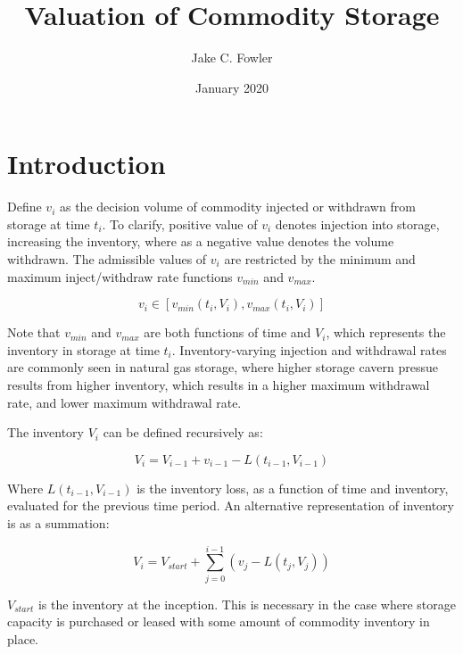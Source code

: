 \documentclass{article}
\title{Valuation of Commodity Storage}
\author{Jake C. Fowler}
\date{January 2020}
\begin{document}
\newcommand{\+}[1]{\ensuremath{\mathbf{#1}}}

\maketitle

\section{Introduction}

Define $v_i$ as the decision volume of commodity injected or withdrawn from storage at time
$t_i$. To clarify, positive value of $v_i$ denotes injection into storage, increasing the
inventory, where as a negative value denotes the volume withdrawn. The admissible values
of $v_i$ are restricted by the minimum and maximum inject/withdraw rate functions
$v_{min}$ and $v_{max}$.

\begin{equation}
    v_i \in [v_{min}(t_i, V_i), v_{max}(t_i, V_i)]
\end{equation}

Note that $v_{min}$ and $v_{max}$ are both functions of time and $V_i$, which represents the
inventory in storage at time $t_i$. Inventory-varying injection and withdrawal rates are commonly
seen in natural gas storage, where higher storage cavern pressue results from higher inventory,
which results in a higher maximum withdrawal rate, and lower maximum withdrawal rate.

\bigskip

The inventory $V_i$ can be defined recursively as:

\begin{equation}
    V_i = V_{i-1} + v_{i-1} - L(t_{i-1}, V_{i-1}) 
\end{equation}

Where $L(t_{i-1}, V_{i-1})$ is the inventory loss, as a function of time and inventory, 
evaluated for the previous time period. An alternative representation of inventory is 
as a summation:

\begin{equation}
    V_i = V_{start} + \sum\limits^{i-1}_{j=0} {(v_{j} - L(t_j, V_j))}
\end{equation}

$V_{start}$ is the inventory at the inception. This is necessary in the case where storage
capacity is purchased or leased with some amount of commodity inventory in place.

\bigskip
\end{document}
